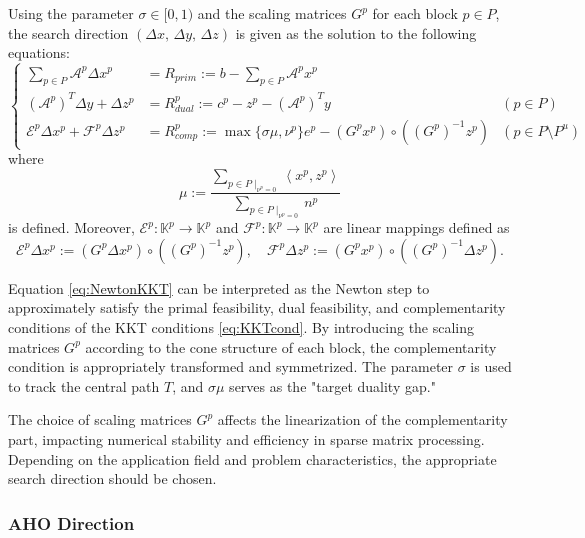 \documentclass{scrartcl}
\begin{document}
Using the parameter $\sigma \in [0,1)$ and the scaling matrices $G^p$ for each block $p \in P$, the search direction $(\Delta x,\, \Delta y,\, \Delta z)$ is given as the solution to the following equations:
\begin{equation}
    \renewcommand{\arraystretch}{2.5}
    \left\{
    \begin{array}{rll}
         \sum_{p \in P} \mathcal{A}^p \Delta x^p & = R_{prim} := b - \sum_{p \in P} \mathcal{A}^p x^p &  \\
         (\mathcal{A}^p)^T \Delta y + \Delta z^p & = R_{dual}^p := c^p - z^p - (\mathcal{A}^p)^T y & (p \in P) \\
         \mathcal{E}^p \Delta x^p + \mathcal{F}^p \Delta z^p & = R_{comp}^p := \max\{\sigma \mu, \nu^p\} e^p - (G^p x^p) \circ ((G^p)^{-1} z^p) & (p \in P \setminus P^u)
    \end{array}
    \right.
    \label{eq:NewtonKKT}
\end{equation}
where
\begin{equation}
  \mu := \frac{\sum_{p \in P \mid_{\nu^p=0}} \left\langle x^p, z^p \right\rangle}
              {\sum_{p \in P \mid_{\nu^p=0}} n^p}
  \label{eq:mu}
\end{equation}
is defined.
Moreover, $\mathcal{E}^p : \mathbb{K}^p \to \mathbb{K}^p$ and $\mathcal{F}^p : \mathbb{K}^p \to \mathbb{K}^p$ are linear mappings defined as
\[
  \mathcal{E}^p \Delta x^p
    := (G^p \Delta x^p) \circ ((G^p)^{-1} z^p),
  \quad
  \mathcal{F}^p \Delta z^p
    := (G^p x^p) \circ ((G^p)^{-1} \Delta z^p).
\]

Equation \eqref{eq:NewtonKKT} can be interpreted as the Newton step to approximately satisfy the primal feasibility, dual feasibility, and complementarity conditions of the KKT conditions \eqref{eq:KKTcond}.
By introducing the scaling matrices $G^p$ according to the cone structure of each block, the complementarity condition is appropriately transformed and symmetrized.
The parameter $\sigma$ is used to track the central path $T$, and $\sigma \mu$ serves as the "target duality gap."

The choice of scaling matrices $G^p$ affects the linearization of the complementarity part, impacting numerical stability and efficiency in sparse matrix processing.
Depending on the application field and problem characteristics, the appropriate search direction should be chosen.

\medskip


\subsubsection{AHO Direction}
\end{document}
